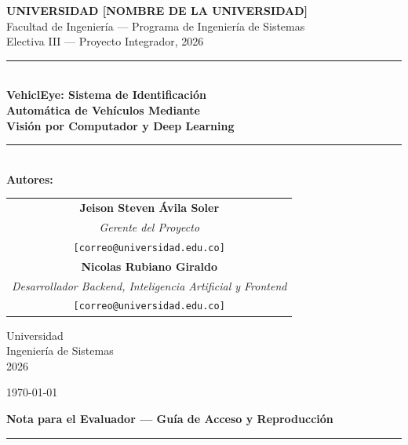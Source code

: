\documentclass[12pt,a4paper]{article}
\begin{document}
\begin{titlepage}
    \centering
    \vspace*{1.5cm}

    {\Large \textbf{UNIVERSIDAD [NOMBRE DE LA UNIVERSIDAD]}}\\[0.3cm]
    {\large Facultad de Ingeniería --- Programa de Ingeniería de Sistemas}\\[0.2cm]
    {\small Electiva III --- Proyecto Integrador, 2026}

    \vspace{1.5cm}
    \rule{\linewidth}{1.5pt}\\[0.4cm]

    {\LARGE \bfseries VehiclEye: Sistema de Identificación\\[0.2cm]
    Automática de Vehículos Mediante\\[0.2cm]
    Visión por Computador y Deep Learning}

    \rule{\linewidth}{1.5pt}\\[0.8cm]

    \vspace{0.5cm}
    {\large \textbf{Autores:}}\\[0.4cm]
    \begin{tabular}{c}
        \textbf{Jeison Steven Ávila Soler} \\
        \textit{Gerente del Proyecto} \\
        \texttt{[correo@universidad.edu.co]} \\[0.6cm]
        \textbf{Nicolas Rubiano Giraldo} \\
        \textit{Desarrollador Backend, Inteligencia Artificial y Frontend} \\
        \texttt{[correo@universidad.edu.co]} \\
    \end{tabular}

    \vspace{1cm}
    {\large Universidad \\ Ingeniería de Sistemas \\ 2026}

    \vfill
    {\small \today}
\end{titlepage}

\thispagestyle{fancy}
\newpage

\begin{center}
    {\large \bfseries Nota para el Evaluador --- Guía de Acceso y Reproducción}
\end{center}
\vspace{0.3cm}
\hrule
\vspace{0.5cm}
\end{document}
